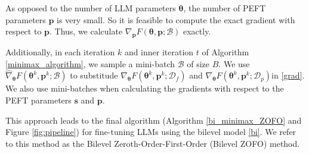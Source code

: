 As opposed to the number of LLM parameters ${ \bm{\theta}}$, the number of PEFT parameters ${ \mathbf{p}}$ is very small. So it is feasible to compute the exact gradient with respect to ${ \mathbf{p}}$. Thus, we calculate $\nabla_{ \mathbf{p}} F({ \bm{\theta}}, { \mathbf{p}}; \mathcal{B})$ exactly.

Additionally, in each iteration $k$ and inner iteration $t$ of Algorithm \ref{minimax_algorithm}, we sample a mini-batch $\mathcal{B}$ of size $B$. We use $\hat{\nabla}_{{ \bm{\theta}}} F({ \bm{\theta}}^k, { \mathbf{p}}^k;\mathcal{B}) $
to substitude $\nabla_{{ \bm{\theta}}} F({ \bm{\theta}}^k, { \mathbf{p}}^k;\mathcal{D}_f)$ and $\nabla_{{ \bm{\theta}}} F({ \bm{\theta}}^k, { \mathbf{p}}^k;\mathcal{D}_p)$in \eqref{grad}. We also use mini-batches when calculating the gradients with respect to the PEFT parameters ${ \mathbf{s}}$ and ${ \mathbf{p}}$. 

This approach leads to the final algorithm (Algorithm \ref{bi_minimax_ZOFO} and Figure \ref{fig:pipeline}) for fine-tuning LLMs using the bilevel model \eqref{bi}. We refer to this method as the Bilevel Zeroth-Order-First-Order (Bilevel ZOFO) method.

